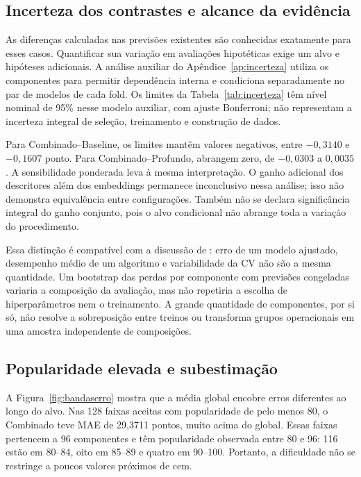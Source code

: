 \subsection{Incerteza dos contrastes e alcance da evidência}\label{subsec:incerteza}
As diferenças calculadas nas previsões existentes são conhecidas exatamente para esses casos. Quantificar sua variação em avaliações hipotéticas exige um alvo e hipóteses adicionais. A análise auxiliar do Apêndice~\ref{ap:incerteza} utiliza os componentes para permitir dependência interna e condiciona separadamente no par de modelos de cada fold. Os limites da Tabela~\ref{tab:incerteza} têm nível nominal de 95\% nesse modelo auxiliar, com ajuste Bonferroni; não representam a incerteza integral de seleção, treinamento e construção de dados.



Para Combinado--Baseline, os limites mantêm valores negativos, entre $-0,3140$ e $-0,1607$ ponto. Para Combinado--Profundo, abrangem zero, de $-0,0303$ a $0,0035$. A sensibilidade ponderada leva à mesma interpretação. O ganho adicional dos descritores além dos embeddings permanece inconclusivo nessa análise; isso não demonstra equivalência entre configurações. Também não se declara significância integral do ganho conjunto, pois o alvo condicional não abrange toda a variação do procedimento.

Essa distinção é compatível com a discussão de : erro de um modelo ajustado, desempenho médio de um algoritmo e variabilidade da CV não são a mesma quantidade. Um bootstrap das perdas por componente com previsões congeladas variaria a composição da avaliação, mas não repetiria a escolha de hiperparâmetros nem o treinamento. A grande quantidade de componentes, por si só, não resolve a sobreposição entre treinos ou transforma grupos operacionais em uma amostra independente de composições.

\subsection{Popularidade elevada e subestimação}
A Figura~\ref{fig:bandaserro} mostra que a média global encobre erros diferentes ao longo do alvo. Nas 128 faixas aceitas com popularidade de pelo menos 80, o Combinado teve MAE de 29,3711 pontos, muito acima do global. Essas faixas pertencem a 96 componentes e têm popularidade observada entre 80 e 96: 116 estão em 80--84, oito em 85--89 e quatro em 90--100. Portanto, a dificuldade não se restringe a poucos valores próximos de cem.

